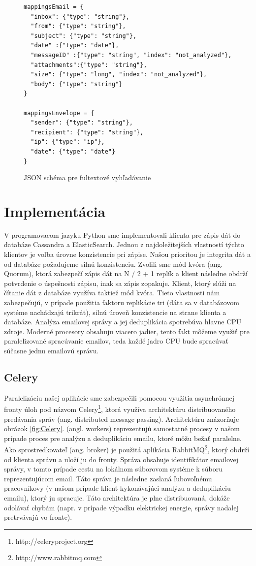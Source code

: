 \documentclass[11pt,twoside,a4paper]{book}
\begin{document}
\begin{figure}[h]
\begin{verbatim}
mappingsEmail = {
  "inbox": {"type": "string"},
  "from": {"type": "string"},
  "subject": {"type": "string"},
  "date" :{"type": "date"},
  "messageID" :{"type": "string", "index": "not_analyzed"},
  "attachments":{"type": "string"},
  "size": {"type": "long", "index": "not_analyzed"},
  "body": {"type": "string"}
}   
            
mappingsEnvelope = {
  "sender": {"type": "string"},
  "recipient": {"type": "string"},
  "ip": {"type": "ip"},
  "date": {"type": "date"}
}     
\end{verbatim}
 \caption{JSON schéma pre fultextové vyhľadávanie}
 \label{fig:ESschema}
\end{figure}      


\section{Implementácia}

V programovacom jazyku Python sme implementovali klienta pre zápis dát do databáze Cassandra a ElasticSearch. Jednou z najdoležitejších vlastností týchto klientov je voľba úrovne konzistencie pri zápise. Našou prioritou je integrita dát a od databáze požadujeme silnú konzistenciu. Zvolili sme mód kvóra (ang. Quorum), ktorá zabezpečí zápis dát na N / 2 + 1 replík a klient následne obdrží potvrdenie o úspešnosti zápisu, inak sa zápis zopakuje. Klient, ktorý slúži na čítanie dát z databáze využíva taktiež mód kvóra. Tieto vlastnosti nám zabezpečujú, v prípade použitia faktoru replikácie tri (dáta sa v databázovom systéme nachádzajú trikrát), silnú úroveň konzistencie na strane klienta a databáze. Analýza emailovej správy a jej deduplikácia spotrebúva hlavne CPU zdroje. Moderné procesory obsahuju viacero jadier, tento fakt môžeme využiť pre paralelizované spracúvanie emailov, teda každé jadro CPU bude spracúvať súčasne jednu emailovú správu.

\subsection*{Celery}
Paralelizáciu našej aplikácie sme zabezpečili pomocou využitia asynchrónnej fronty úloh pod názvom Celery\footnote{http://celeryproject.org}, ktorá využíva architektúru distribuovaného predávania správ (ang. distributed message passing). Architektúru znázorňuje obrázok \ref{fig:Celery}.  (angl. workers) reprezentujú samostatné procesy v našom prípade proces pre analýzu a deduplikáciu emailu, ktoré môžu bežať paralelne. Ako sprostredkovateľ (ang. broker) je použitá aplikácia RabbitMQ\footnote{http://www.rabbitmq.com}, ktorý obdrží od klienta správu a uloží ju do fronty. Správa obsahuje identifikátor emailovej správy, v tomto prípade cestu na lokálnom súborovom systéme k súboru reprezentujúcom email. Táto správa je následne zaslaná ľubovoľnému pracovníkovy (v našom prípade klient kykonávajúci analýzu a deduplikáciu emailu), ktorý ju spracuje. Táto architektúra je plne distribuovaná, dokáže odolávať chybám (napr. v prípade výpadku elektrickej energie, správy nadalej pretrvávajú vo fronte).
\end{document}
